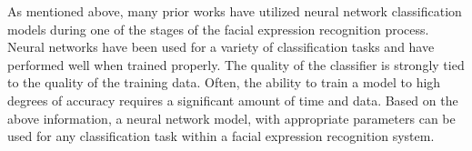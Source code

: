\documentclass{IEEEtran}
\begin{document}
As mentioned above, many prior works have utilized neural network classification models during one of the stages of the facial expression recognition process. Neural networks have been used for a variety of classification tasks and have performed well when trained properly. The quality of the classifier is strongly tied to the quality of the training data. Often, the ability to train a model to high degrees of accuracy requires a significant amount of time and data. Based on the above information, a neural network model, with appropriate parameters can be used for any classification task within a facial expression recognition system.


\iffalse
\newpage


\end{document}
